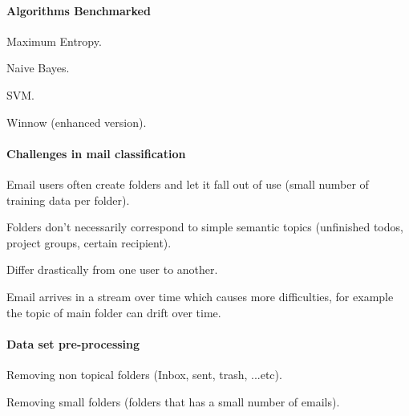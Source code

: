 \documentclass[12pt]{article}
\newenvironment{my_itemize}
{\begin{itemize}
  \setlength{\itemsep}{0cm}
  \setlength{\parskip}{0cm}}
{\end{itemize}}
\begin{document}
\paragraph{Algorithms Benchmarked}
\begin{my_itemize}
  \item Maximum Entropy.
  \item Naive Bayes.
  \item SVM.
  \item Winnow (enhanced version).
\end{my_itemize}

\paragraph{Challenges in mail classification}
\begin{my_itemize}
  \item Email users often create folders and let it fall out of use 
	(small number of training data per folder).
  \item Folders don’t necessarily correspond to simple semantic topics 
	(unfinished todos, project groups, certain recipient).
  \item Differ drastically from one user to another.
  \item Email arrives in a stream over time which causes more difficulties, 
	for example the topic of main folder can drift over time.
\end{my_itemize}


\paragraph{Data set pre-processing}
\begin{my_itemize}
    \item Removing non topical folders (Inbox, sent, trash, ...etc).
    \item Removing small folders (folders that has a small number of emails).
\end{my_itemize}
\end{document}
